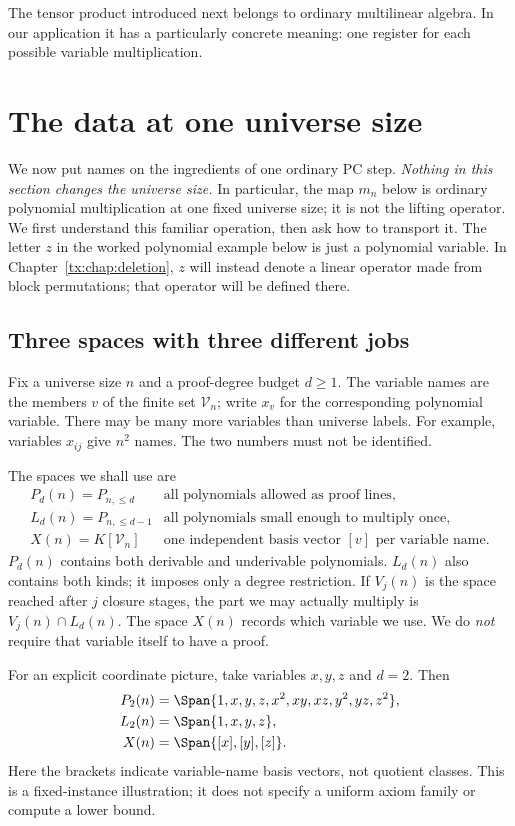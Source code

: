 The tensor product introduced next belongs to ordinary multilinear
algebra. In our application it has a particularly concrete meaning:
one register for each possible variable multiplication.

\section{The data at one universe size}
\label{tx:sec:multiplication-registers}
We now put names on the ingredients of one ordinary PC step.
\emph{Nothing in this section changes the universe size.}
In particular, the map $m_n$ below is ordinary polynomial
multiplication at one fixed universe size; it is not the lifting operator.
We first understand this familiar operation, then ask how to transport it.
The letter $z$ in the worked polynomial example below is just a
polynomial variable. In Chapter~\ref{tx:chap:deletion}, $z$ will instead
denote a linear operator made from block permutations; that operator
will be defined there.

\subsection{Three spaces with three different jobs}
Fix a universe size $n$ and a proof-degree budget $d\ge1$.
The variable names are the members $v$ of the finite set
$\mathcal V_n$; write $x_v$ for the corresponding polynomial variable.
There may be many more variables than universe labels.
For example, variables $x_{ij}$ give $n^2$ names.
The two numbers must not be identified.

The spaces we shall use are
\[
 \begin{array}{ll}
 P_d(n)=P_{n,\le d}
   &\text{all polynomials allowed as proof lines},\\
 L_d(n)=P_{n,\le d-1}
   &\text{all polynomials small enough to multiply once},\\
 X(n)=K[\mathcal V_n]
   &\text{one independent basis vector $[v]$ per variable name}.
 \end{array}
\]
$P_d(n)$ contains both derivable and underivable polynomials.
$L_d(n)$ also contains both kinds; it imposes only a degree restriction.
If $V_j(n)$ is the space reached after $j$ closure stages, the part
we may actually multiply is $V_j(n)\cap L_d(n)$.
The space $X(n)$ records which variable we use. We do \emph{not}
require that variable itself to have a proof.

For an explicit coordinate picture, take variables $x,y,z$ and $d=2$.
Then
\[
 \begin{split}
 P_2(n)&=\Span\{1,x,y,z,x^2,xy,xz,y^2,yz,z^2\},\\
 L_2(n)&=\Span\{1,x,y,z\},\\
 X(n)&=\Span\{[x],[y],[z]\}.
 \end{split}
\]
Here the brackets indicate variable-name basis vectors, not quotient
classes. This is a fixed-instance illustration; it does not specify
a uniform axiom family or compute a lower bound.

